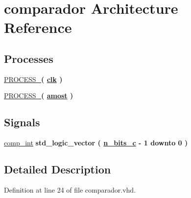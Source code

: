 \hypertarget{classcomparador_1_1comparador}{}\section{comparador Architecture Reference}
\label{classcomparador_1_1comparador}
\subsection*{Processes}
 \begin{DoxyCompactItemize}
\item 
\hyperlink{classcomparador_1_1comparador_a67cbd29443fafed2b0446c1321a8e91c}{P\+R\+O\+C\+E\+S\+S\+\_}{\bfseries  ( {\bfseries {\bfseries \hyperlink{classcomparador_a4a4609c199d30b3adebbeb3a01276ec5}{clk}} \textcolor{vhdlchar}{ }} )}
\item 
\hyperlink{classcomparador_1_1comparador_ab820ba1b225bbde57824e0ed4510038c}{P\+R\+O\+C\+E\+S\+S\+\_}{\bfseries  ( {\bfseries {\bfseries \hyperlink{classcomparador_af9b8278b961604ab62a822537a109adb}{amost}} \textcolor{vhdlchar}{ }} )}
\end{DoxyCompactItemize}
\subsection*{Signals}
 \begin{DoxyCompactItemize}
\item 
\hyperlink{classcomparador_1_1comparador_abf7d8be25624dd08fcc1517c8e39cb23}{comp\+\_\+int} {\bfseries \textcolor{comment}{std\+\_\+logic\+\_\+vector}\textcolor{vhdlchar}{ }\textcolor{vhdlchar}{(}\textcolor{vhdlchar}{ }\textcolor{vhdlchar}{ }\textcolor{vhdlchar}{ }\textcolor{vhdlchar}{ }{\bfseries \hyperlink{classcomparador_afee4aa1628956aa350183d8881689198}{n\+\_\+bits\+\_\+c}} \textcolor{vhdlchar}{-\/}\textcolor{vhdlchar}{ } \textcolor{vhdldigit}{1} \textcolor{vhdlchar}{ }\textcolor{keywordflow}{downto}\textcolor{vhdlchar}{ }\textcolor{vhdlchar}{ } \textcolor{vhdldigit}{0} \textcolor{vhdlchar}{ }\textcolor{vhdlchar}{)}\textcolor{vhdlchar}{ }} 
\end{DoxyCompactItemize}


\subsection{Detailed Description}


Definition at line 24 of file comparador.\+vhd.



